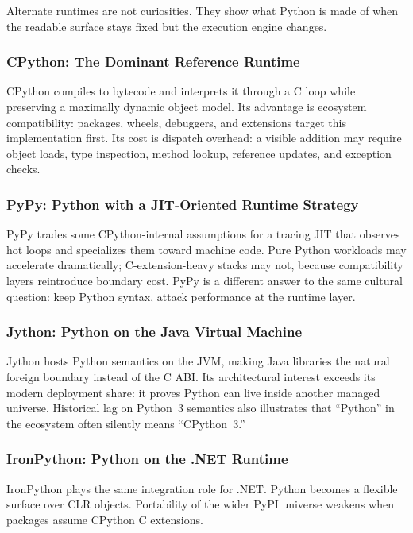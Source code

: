 \documentclass[a4paper,twoside]{report}
\begin{document}
Alternate runtimes are not curiosities. They show what Python is made of when the readable surface stays fixed but the execution engine changes.

\subsubsection{CPython: The Dominant Reference Runtime}

CPython compiles to bytecode and interprets it through a C loop while preserving a maximally dynamic object model. Its advantage is ecosystem compatibility: packages, wheels, debuggers, and extensions target this implementation first. Its cost is dispatch overhead: a visible addition may require object loads, type inspection, method lookup, reference updates, and exception checks.

\subsubsection{PyPy: Python with a JIT-Oriented Runtime Strategy}

PyPy trades some CPython-internal assumptions for a tracing JIT that observes hot loops and specializes them toward machine code. Pure Python workloads may accelerate dramatically; C-extension-heavy stacks may not, because compatibility layers reintroduce boundary cost. PyPy is a different answer to the same cultural question: keep Python syntax, attack performance at the runtime layer.

\subsubsection{Jython: Python on the Java Virtual Machine}

Jython hosts Python semantics on the JVM, making Java libraries the natural foreign boundary instead of the C ABI. Its architectural interest exceeds its modern deployment share: it proves Python can live inside another managed universe. Historical lag on Python~3 semantics also illustrates that ``Python'' in the ecosystem often silently means ``CPython~3.''

\subsubsection{IronPython: Python on the .NET Runtime}

IronPython plays the same integration role for .NET. Python becomes a flexible surface over CLR objects. Portability of the wider PyPI universe weakens when packages assume CPython C extensions.
\end{document}
